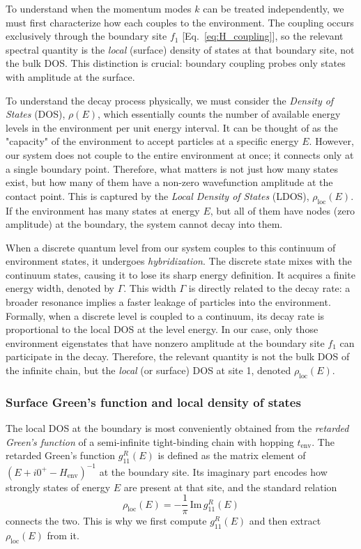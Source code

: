 \documentclass[12pt,oneside,openright]{report}
\theoremstyle{definition}
\theoremstyle{plain}
\theoremstyle{remark}
\begin{document}
To understand when the momentum modes $k$ can be treated independently, we must first characterize 
how each couples to the environment. The coupling occurs exclusively through the boundary site $f_1$ [Eq.~\eqref{eq:H_coupling}], 
so the relevant spectral quantity is the \emph{local} (surface) density of states at that boundary site, not the bulk DOS. This distinction is crucial: boundary coupling probes only states with amplitude at the surface.

To understand the decay process physically, we must consider the \emph{Density of States} (DOS), $\rho(E)$, which essentially counts the number of available energy levels in the environment per unit energy interval. It can be thought of as the "capacity" of the environment to accept particles at a specific energy $E$.
However, our system does not couple to the entire environment at once; it connects only at a single boundary point. Therefore, what matters is not just how many states exist, but how many of them have a non-zero wavefunction amplitude at the contact point. This is captured by the \emph{Local Density of States} (LDOS), $\rho_{\mathrm{loc}}(E)$. If the environment has many states at energy $E$, but all of them have nodes (zero amplitude) at the boundary, the system cannot decay into them.

When a discrete quantum level from our system couples to this continuum of environment states, it undergoes \emph{hybridization}. The discrete state mixes with the continuum states, causing it to lose its sharp energy definition. It acquires a finite energy width, denoted by $\Gamma$. This width $\Gamma$ is directly related to the decay rate: a broader resonance implies a faster leakage of particles into the environment.
Formally, when a discrete level is coupled to a continuum, its decay rate is proportional to the local DOS at the level energy. In our case, only those environment eigenstates that have nonzero amplitude at the boundary site $f_1$ can participate in the decay. Therefore, the relevant quantity is not the bulk DOS of the infinite chain, but the \emph{local} (or surface) DOS at site 1, denoted $\rho_{\mathrm{loc}}(E)$.

\subsubsection{Surface Green's function and local density of states}

The local DOS at the boundary is most conveniently obtained from the \emph{retarded Green's function}
of a semi-infinite tight-binding chain with hopping $t_{\mathrm{env}}$. The retarded Green's function
$g^R_{11}(E)$ is defined as the matrix element of $(E + i0^+ - H_{\mathrm{env}})^{-1}$ at the boundary site.
Its imaginary part encodes how strongly states of energy $E$ are present at that site, and the standard
relation
\begin{equation}
 \rho_{\mathrm{loc}}(E) = -\frac{1}{\pi}\,\mathrm{Im}\, g^{R}_{11}(E)
\end{equation}
connects the two. This is why we first compute $g^{R}_{11}(E)$ and then extract $\rho_{\mathrm{loc}}(E)$ from it.
\end{document}
